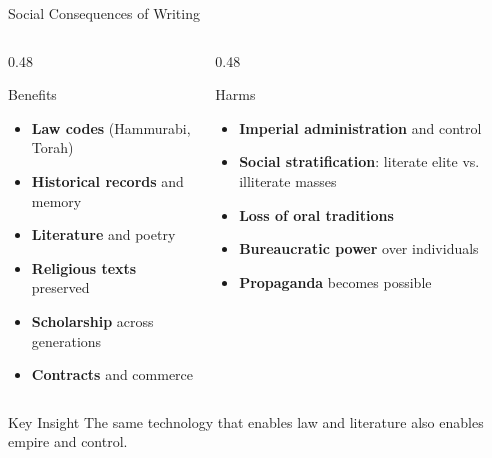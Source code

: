 \documentclass[aspectratio=169]{beamer}
\begin{document}
\begin{frame}{Social Consequences of Writing}
\begin{columns}
\begin{column}{0.48\textwidth}
\begin{block}{\faThumbsUp\hspace{0.3em}Benefits}
\begin{itemize}
  \item \textbf{Law codes} (Hammurabi, Torah)
  \item \textbf{Historical records} and memory
  \item \textbf{Literature} and poetry
  \item \textbf{Religious texts} preserved
  \item \textbf{Scholarship} across generations
  \item \textbf{Contracts} and commerce
\end{itemize}
\end{block}
\end{column}

\begin{column}{0.48\textwidth}
\begin{alertblock}{\faThumbsDown\hspace{0.3em}Harms}
\begin{itemize}
  \item \textbf{Imperial administration} and control
  \item \textbf{Social stratification}: literate elite vs. illiterate masses
  \item \textbf{Loss of oral traditions}
  \item \textbf{Bureaucratic power} over individuals
  \item \textbf{Propaganda} becomes possible
\end{itemize}
\end{alertblock}
\end{column}
\end{columns}

\vspace{0.5em}
\begin{exampleblock}{Key Insight}
The same technology that enables law and literature also enables empire and control.
\end{exampleblock}
\end{frame}
\end{document}
